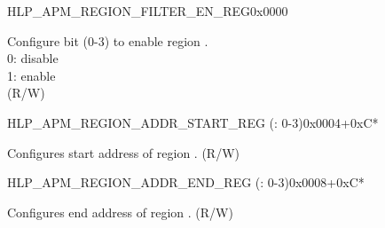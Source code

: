\begin{register}{H}{LP\_APM\_REGION\_FILTER\_EN\_REG}{0x0000}\label{regdesc:LPAPMREGIONFILTERENREG}
%
%
\regnewline%
\begin{regdesc}\begin{reglist}
\label{fielddesc:LPAPMREGIONFILTEREN}\item [LP\_APM\_REGION\_FILTER\_EN] Configure bit  (0-3) to enable region .\\ 
0: disable \\ 
1: enable  \\ (R/W)
\end{reglist}\end{regdesc}
\end{register}


\begin{register}{H}{LP\_APM\_REGION\_ADDR\_START\_REG (: 0-3)}{0x0004+0xC*}\label{regdesc:LPAPMREGION0ADDRSTARTREG}
%
\regnewline%
\begin{regdesc}\begin{reglist}
\label{fielddesc:LPAPMREGION0ADDRSTART}\item [LP\_APM\_REGION\regindex{n}\_ADDR\_START] Configures start address of region . (R/W)
\end{reglist}\end{regdesc}
\end{register}


\begin{register}{H}{LP\_APM\_REGION\_ADDR\_END\_REG (: 0-3)}{0x0008+0xC*} \label{regdesc:LPAPMREGION0ADDRENDREG}
%
\regnewline%
\begin{regdesc}\begin{reglist}
\label{fielddesc:LPAPMREGION0ADDREND}\item [LP\_APM\_REGION\regindex{n}\_ADDR\_END] Configures end address of region . (R/W)
\end{reglist}\end{regdesc}
\end{register}

















